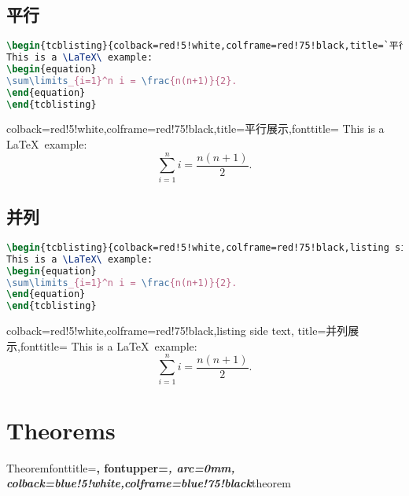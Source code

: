 \documentclass{ctexart}
\begin{document}
\subsection{平行}
\begin{lstlisting}[language={TeX}]
\begin{tcblisting}{colback=red!5!white,colframe=red!75!black,title=`平行展示`,fonttitle=\bfseries}
This is a \LaTeX\ example:
\begin{equation}
\sum\limits_{i=1}^n i = \frac{n(n+1)}{2}.
\end{equation}
\end{tcblisting}
\end{lstlisting}
\begin{tcblisting}{colback=red!5!white,colframe=red!75!black,title=平行展示,fonttitle=\bfseries}
This is a \LaTeX\ example:
\begin{equation}
\sum\limits_{i=1}^n i = \frac{n(n+1)}{2}.
\end{equation}
\end{tcblisting}

\subsection{并列}
\begin{lstlisting}[language={TeX}]
\begin{tcblisting}{colback=red!5!white,colframe=red!75!black,listing side text,title=`并列展示`,fonttitle=\bfseries}
This is a \LaTeX\ example:
\begin{equation}
\sum\limits_{i=1}^n i = \frac{n(n+1)}{2}.
\end{equation}
\end{tcblisting}
\end{lstlisting}
\begin{tcblisting}{colback=red!5!white,colframe=red!75!black,listing side text,
  title=并列展示,fonttitle=\bfseries}
This is a \LaTeX\ example:
\begin{equation}
\sum\limits_{i=1}^n i = \frac{n(n+1)}{2}.
\end{equation}
\end{tcblisting}


\section{Theorems}

%
  {Theorem}{fonttitle=\bfseries\upshape, fontupper=\slshape,
     arc=0mm, colback=blue!5!white,colframe=blue!75!black}{theorem}
\end{document}
